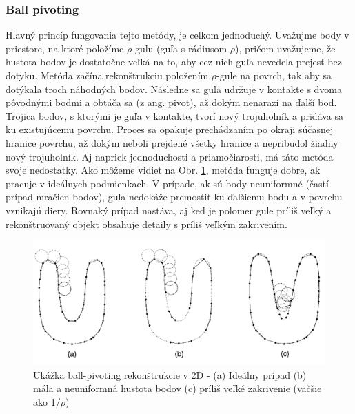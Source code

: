\subsubsection{Ball pivoting}
\noindent Hlavný princíp fungovania tejto metódy, je celkom jednoduchý. Uvažujme body v priestore, na ktoré položíme $\rho$-guľu (guľa s rádiusom $\rho$), pričom uvažujeme, že hustota bodov je dostatočne veľká na to, aby cez nich guľa nevedela prejesť bez dotyku. Metóda začína rekonštrukciu položením $\rho$-gule na povrch, tak aby sa dotýkala troch náhodných bodov. Následne sa guľa udržuje v kontakte s dvoma pôvodnými bodmi a obtáča sa (z ang. pivot), až dokým nenarazí na ďalší bod. Trojica bodov, s ktorými je guľa v kontakte, tvorí nový trojuholník a pridáva sa ku existujúcemu povrchu. Proces sa opakuje prechádzaním po okraji súčasnej hranice povrchu, až dokým neboli prejdené všetky hranice a nepribudol žiadny nový trojuholník. \cite{ball_pivot_origin}
\newline\indent Aj napriek jednoduchosti a priamočiarosti, má táto metóda svoje nedostatky. Ako môžeme vidieť na Obr. \ref{fig:ball_pivot}, metóda funguje dobre, ak pracuje v ideálnych podmienkach. V prípade, ak sú body neuniformné (častí prípad mračien bodov), guľa nedokáže premostiť ku ďalšiemu bodu a v povrchu vznikajú diery. Rovnaký prípad nastáva, aj keď je polomer gule príliš veľký a rekonštruovaný objekt obsahuje detaily s príliš veľkým zakrivením.
\begin{figure}[!htbp]
  \centering
  \includegraphics[width=16cm]{img/ball_pivoting.png}
  \caption{Ukážka ball-pivoting rekonštrukcie v 2D - (a) Ideálny prípad (b) mála a neuniformná hustota bodov (c) príliš veľké zakrivenie (väčšie ako 1/$\rho$) \cite{poisson_origin}} 
  \label{fig:ball_pivot}
\end{figure} 


